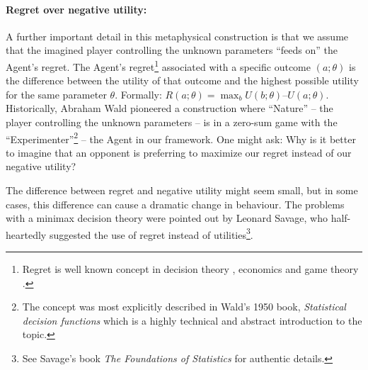 \documentclass{article}
\begin{document}
\paragraph{Regret over negative utility:}
A further important detail in this metaphysical construction is that we assume that the imagined player controlling the unknown parameters ``feeds on'' the Agent’s regret.
The Agent’s regret\footnote{Regret is well known concept in decision theory \cite{paper:Milnor}, economics \cite{book:EconomicsDictionary} and game theory \cite{book:EssentialGameTheory}.} associated with a specific outcome $(a;\theta)$ is the difference between the utility of that outcome and the highest possible utility for the same parameter $\theta$. Formally: $R(a;\theta) = \max_{b} U(b;\theta) – U(a;\theta)$.
Historically, Abraham Wald pioneered a construction where ``Nature'' – the player controlling the unknown parameters – is in a zero-sum game with the ``Experimenter''\footnote{The concept was most explicitly described in Wald's 1950 book, \emph{Statistical decision functions} \cite{book:Wald} which is a highly technical and abstract introduction to the topic.} – the Agent in our framework.
One might ask: Why is it better to imagine that an opponent is preferring to maximize our regret instead of our negative utility?

The difference between regret and negative utility might seem small, but in some cases, this difference can cause a dramatic change in behaviour.
The problems with a minimax decision theory were pointed out by Leonard Savage, who half-heartedly suggested the use of regret instead of utilities\footnote{See Savage's book \emph{The Foundations of Statistics} \cite{book:Savage} for authentic details.}.
\end{document}
